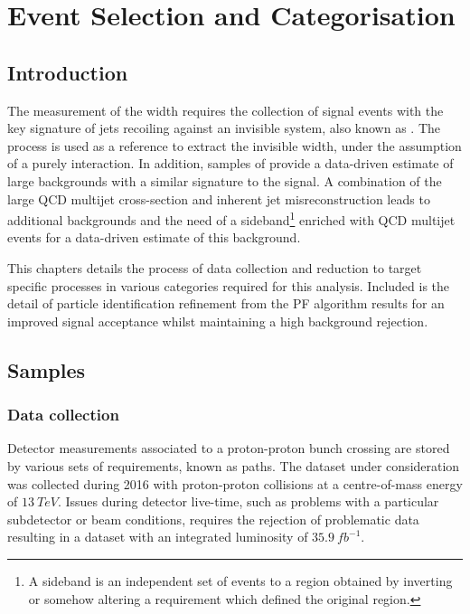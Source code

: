 \chapter{Event Selection and Categorisation}
\label{chap:analysis}


\section{Introduction}

The measurement of the \IZinv width requires the collection of \IZvvj signal events with the key signature of jets recoiling against an invisible system, also known as \metplusjets. The \IDYllj process is used as a reference to extract the invisible width, under the assumption of a purely \SM \IZll interaction. In addition, samples of \IWlvj provide a data-driven estimate of large backgrounds with a similar signature to the signal. A combination of the large QCD multijet cross-section and inherent jet misreconstruction leads to additional backgrounds and the need of a sideband\footnote{A sideband is an independent set of events to a region obtained by inverting or somehow altering a requirement which defined the original region.} enriched with QCD multijet events for a data-driven estimate of this background.

This chapters details the process of data collection and reduction to target specific processes in various categories required for this analysis. Included is the detail of particle identification refinement from the PF algorithm results for an improved signal acceptance whilst maintaining a high background rejection.

\section{Samples}

\subsection{Data collection}

Detector measurements associated to a proton-proton bunch crossing are stored by various sets of \SWT requirements, known as \SWT paths. The dataset under consideration was collected during 2016 with proton-proton collisions at a centre-of-mass energy of ${\SI{13}{TeV}}$. Issues during detector live-time, such as problems with a particular subdetector or beam conditions, requires the rejection of problematic data resulting in a dataset with an integrated luminosity of ${\SI{35.9}{fb^{-1}}}$.

